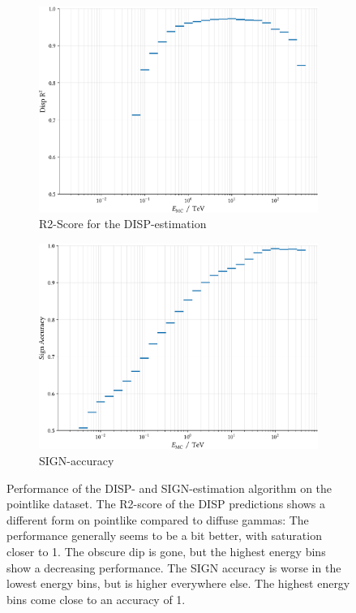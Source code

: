 \begin{figure}
    \begin{subfigure}{0.45\textwidth}
        \includegraphics[width=0.9\linewidth]{../analysis/plots/disp_gamma_r2_equal_sized.pdf} 
        \caption{R2-Score for the DISP-estimation}
    \end{subfigure}
    \begin{subfigure}{0.45\textwidth}
        \includegraphics[width=0.9\linewidth]{../analysis/plots/disp_gamma_acc_equal_sized.pdf}
        \caption{SIGN-accuracy}
    \end{subfigure}
    \caption{
	Performance of the DISP- and SIGN-estimation algorithm on the pointlike dataset.
    	The R2-score of the DISP predictions shows a different form on pointlike
	compared to diffuse gammas: The performance generally seems to be a bit better, 
	with saturation closer to 1. The obscure dip is gone, but the highest energy bins
	show a decreasing performance. The SIGN accuracy is worse in the lowest energy bins,
	but is higher everywhere else. The highest energy bins come close to an accuracy of 1.}
    \label{fig:disp_gamma_perf}
\end{figure}

